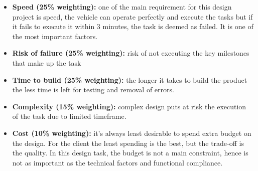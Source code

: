 \documentclass[a4paper]{article}
\begin{document}
\begin{itemize}
\item \textbf{Speed (25\% weighting):} one of the main requirement for this design project is speed, the vehicle can operate perfectly and execute the tasks but if it fails to execute it within 3 minutes, the task is deemed as failed. It is one of the most important factors.
\item \textbf{Risk of failure (25\% weighting):} risk of not executing the key milestones that make up the task 
\item \textbf{Time to build (25\% weighting):} the longer it takes to build the product the less time is left for testing and removal of errors.
\item \textbf{Complexity (15\% weighting):} complex design puts at risk the execution of the task due to limited timeframe.
\item \textbf{Cost (10\% weighting):} it’s always least desirable to spend extra budget on the design. For the client the least spending is the best, but the trade-off is the quality. In this design task, the budget is not a main constraint, hence is not as important as the technical factors and functional compliance.
\end{itemize}
\newpage
\end{document}

